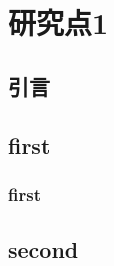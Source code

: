 \chapter{研究点1}\label{chap:chap1}

\section{引言}

\section{first}

\subsection{first}

\section{second}





































